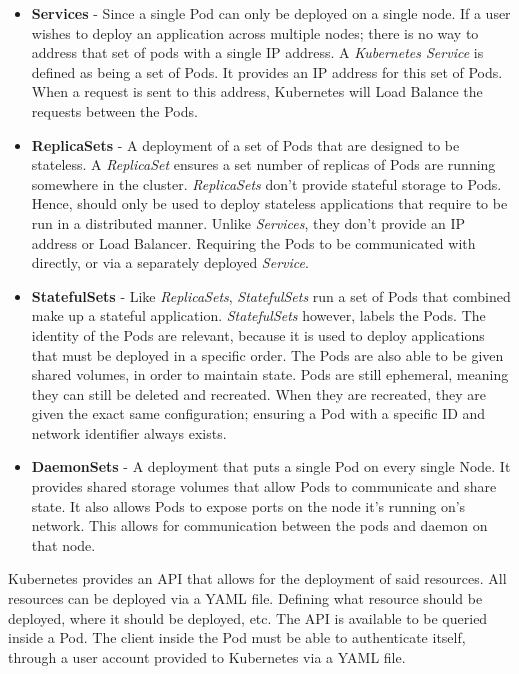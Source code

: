 \documentclass[a4paper,12pt]{report}
\begin{document}
\begin{itemize}
    \item \textbf{Services} - Since a single Pod can only be deployed on a single node. If a user wishes to deploy an application across multiple nodes; there is no way to address that set of pods with a single IP address. A \textit{Kubernetes Service} is defined as being a set of Pods. It provides an IP address for this set of Pods. When a request is sent to this address, Kubernetes will Load Balance the requests between the Pods.
    \item \textbf{ReplicaSets} - A deployment of a set of Pods that are designed to be stateless. A \textit{ReplicaSet} ensures a set number of replicas of Pods are running somewhere in the cluster. \textit{ReplicaSets} don't provide stateful storage to Pods. Hence, should only be used to deploy stateless applications that require to be run in a distributed manner. Unlike \textit{Services}, they don't provide an IP address or Load Balancer. Requiring the Pods to be communicated with directly, or via a separately deployed \textit{Service}.
    \item \textbf{StatefulSets} - Like \textit{ReplicaSets}, \textit{StatefulSets} run a set of Pods that combined make up a stateful application.
    \textit{StatefulSets} however, labels the Pods. The identity of the Pods are relevant, because it is used to deploy applications
    that must be deployed in a specific order. The Pods are also able to be given shared volumes, in order to maintain state. 
    Pods are still ephemeral, meaning they can still be deleted and recreated. When they are recreated, they are given the exact same configuration; ensuring a Pod with a specific ID and network identifier always exists.  
    \item \textbf{DaemonSets} - A deployment that puts a single Pod on every single Node. It provides shared storage volumes that allow Pods to communicate and share state. It also allows Pods to expose ports on the node it's running on's network. This allows for communication between the pods and daemon on that node.
\end{itemize}

Kubernetes provides an API that allows for the deployment of said resources. All resources can be deployed via a YAML file. Defining what resource should be deployed, where it should be deployed, etc. The API is available to be queried inside a Pod. The client inside the Pod must be able to authenticate itself, through a user account provided to Kubernetes via a YAML file.
\end{document}

